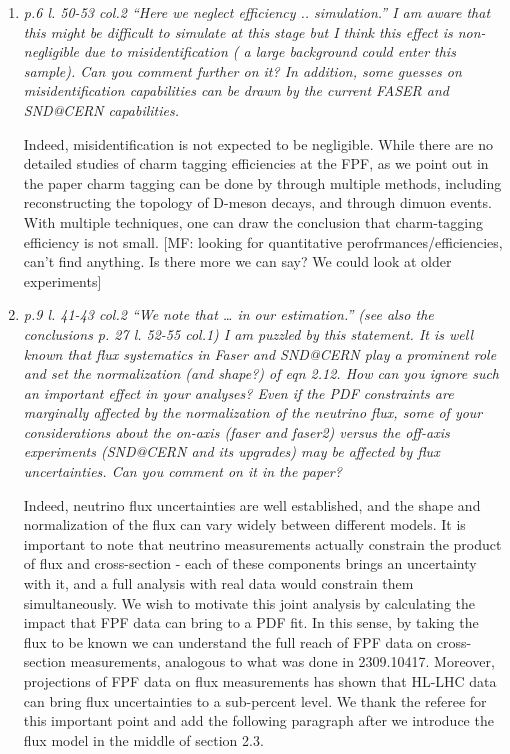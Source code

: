 \documentclass[11pt,a4paper]{article}
\begin{document}
\begin{enumerate}
\item{\it p.6 l. 50-53 col.2 “Here we neglect efficiency .. simulation.” I am aware that this might be difficult to simulate at this stage but I think this effect is non-negligible due to misidentification ( a large background could enter this sample). Can you comment further on it? In addition, some guesses on misidentification capabilities can be drawn by the current FASER and SND@CERN capabilities.}

Indeed, misidentification is not expected to be negligible. While there are no detailed studies of charm tagging efficiencies at the FPF, as we point out in the paper charm tagging can be done by through multiple methods, including reconstructing the topology of D-meson decays, and through dimuon events. With multiple techniques, one can draw the conclusion that charm-tagging efficiency is not small.
{\color {red} [MF: looking for quantitative perofrmances/efficiencies, can't find anything. Is there more we can say? We could look at older experiments]}

\item{\it p.9 l. 41-43 col.2 “We note that … in our estimation.” (see also the conclusions p. 27 l. 52-55 col.1) I am puzzled by this statement. It is well known that flux systematics in Faser and SND@CERN play a prominent role and set the normalization (and shape?) of eqn 2.12. How can you ignore such an important effect in your analyses? Even if the PDF constraints are marginally affected by the normalization of the neutrino flux, some of your considerations about the on-axis (faser and faser2) versus the off-axis experiments (SND@CERN and its upgrades) may be affected by flux uncertainties. Can you comment on it in the paper?}

Indeed, neutrino flux uncertainties are well established, and the shape and normalization of the flux can vary widely between different models. It is important to note that neutrino measurements actually constrain the product of flux and cross-section - each of these components brings an uncertainty with it, and a full analysis with real data would constrain them simultaneously. We wish to motivate this joint analysis by calculating the  impact that FPF data can bring to a PDF fit. In this sense, by taking the flux to be known we can understand the full reach of FPF data on cross-section measurements, analogous to what was done in 2309.10417. Moreover, projections of FPF data on flux measurements has shown that HL-LHC data can bring flux uncertainties to a sub-percent level. We thank the referee for this important point and add the following paragraph after we introduce the flux model in the middle of section 2.3. 


\end{enumerate}
\end{document}
